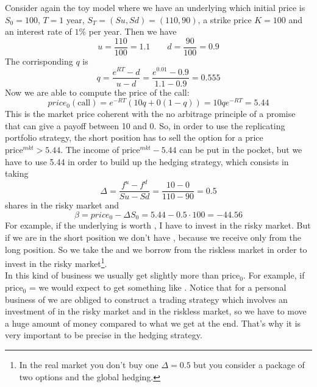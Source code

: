 \begin{example}{}{}
Consider again the toy model where we have an underlying which initial price is $S_0=100$, $T=1$ year, $S_T=(Su,Sd)=(110,90)$, a strike price $K=100$ and an interest rate of $1\%$ per year. Then we have
\begin{equation*}
    u = \dfrac{110}{100} = 1.1 \qquad d = \dfrac{90}{100} = 0.9
\end{equation*}
The corrisponding $q$ is
\begin{equation*}
    q = \dfrac{e^{RT}-d}{u-d} = \dfrac{e^{0.01}-0.9}{1.1-0.9} = 0.555
\end{equation*}
Now we are able to compute the price of the call:
\begin{equation}
    price_0(\mbox{call}) = e^{-RT}(10q+ 0(1-q)) = 10qe^{-RT} = 5.44
\end{equation}
This is the market price coherent with the no arbitrage principle of a promise that can give a payoff between 10 and 0. So, in order to use the replicating portfolio strategy, the short position has to sell the option for a price $\mbox{price}^{mkt}>5.44$. The income of $\mbox{price}^{mkt}-5.44$ can be put in the pocket, but we have to use 5.44 in order to build up the hedging strategy, which consists in taking
\begin{equation*}
    \Delta = \dfrac{f^u-f^d}{Su-Sd} = \dfrac{10-0}{110-90} = 0.5
\end{equation*}
shares in the risky market and
\begin{equation*}
    \beta = price_0-\Delta S_0 = 5.44 - 0.5\cdot100 = -44.56
\end{equation*}
For example, if the underlying is worth , I have to invest  in the risky market. But if we are in the short position we don't have , because we receive only  from the long position. So we take the  and we borrow  from the riskless market in order to invest in the risky market\footnote{In the real market you don't buy one $\Delta = 0.5$ but you consider a package of two options and the global hedging.}. \\
In this kind of business we usually get slightly more than price$_0$. For example, if price$_0$ =  we would expect to get something like . Notice that for a personal business of  we are obliged to construct a trading strategy which involves an investment of  in the risky market and  in the riskless market, so we have to move a huge amount of money compared to what we get at the end. That's why it is very important to be precise in the hedging strategy.
\end{example}

